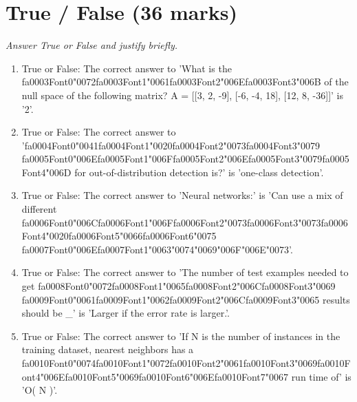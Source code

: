 \documentclass[12pt]{article}
\begin{document}
\section*{True / False (36 marks)}
\textit{Answer True or False and justify briefly.}
\begin{enumerate}[label=\arabic*.]
\item True or False: The correct answer to 'What is the {\csname fa0003Font0\endcsname\char"0072}{\csname fa0003Font1\endcsname\char"0061}{\csname fa0003Font2\endcsname\char"006E}{\csname fa0003Font3\endcsname\char"006B} of the null space of the following matrix? A = [[3, 2, -9], [-6, -4, 18], [12, 8, -36]]' is '2'.
\item True or False: The correct answer to '{\csname fa0004Font0\endcsname\char"0041}{\csname fa0004Font1\endcsname\char"0020}{\csname fa0004Font2\endcsname\char"0073}{\csname fa0004Font3\endcsname\char"0079} {\csname fa0005Font0\endcsname\char"006E}{\csname fa0005Font1\endcsname\char"006F}{\csname fa0005Font2\endcsname\char"006E}{\csname fa0005Font3\endcsname\char"0079}{\csname fa0005Font4\endcsname\char"006D} for out-of-distribution detection is?' is 'one-class detection'.
\item True or False: The correct answer to 'Neural networks:' is 'Can use a mix of different {\csname fa0006Font0\endcsname\char"006C}{\csname fa0006Font1\endcsname\char"006F}{\csname fa0006Font2\endcsname\char"0073}{\csname fa0006Font3\endcsname\char"0073}{\csname fa0006Font4\endcsname\char"0020}{\csname fa0006Font5\endcsname\char"0066}{\csname fa0006Font6\endcsname\char"0075} {\csname fa0007Font0\endcsname\char"006E}{\csname fa0007Font1\endcsname\char"0063}{\char"0074}{\char"0069}{\char"006F}{\char"006E}{\char"0073}'.
\item True or False: The correct answer to 'The number of test examples needed to get {\csname fa0008Font0\endcsname\char"0072}{\csname fa0008Font1\endcsname\char"0065}{\csname fa0008Font2\endcsname\char"006C}{\csname fa0008Font3\endcsname\char"0069} {\csname fa0009Font0\endcsname\char"0061}{\csname fa0009Font1\endcsname\char"0062}{\csname fa0009Font2\endcsname\char"006C}{\csname fa0009Font3\endcsname\char"0065} results should be \_' is 'Larger if the error rate is larger.'.
\item True or False: The correct answer to 'If N is the number of instances in the training dataset, nearest neighbors has a {\csname fa0010Font0\endcsname\char"0074}{\csname fa0010Font1\endcsname\char"0072}{\csname fa0010Font2\endcsname\char"0061}{\csname fa0010Font3\endcsname\char"0069}{\csname fa0010Font4\endcsname\char"006E}{\csname fa0010Font5\endcsname\char"0069}{\csname fa0010Font6\endcsname\char"006E}{\csname fa0010Font7\endcsname\char"0067} run time of' is 'O( N )'.

\end{enumerate}
\end{document}
